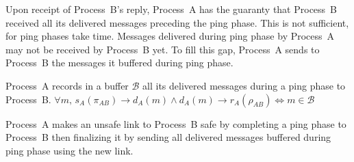 Upon receipt of Process~B's reply, Process~A has the guaranty that Process~B
received all its delivered messages preceding the ping phase. This is not
sufficient, for ping phases take time. Messages delivered during ping phase by
Process~A may not be received by Process~B yet. To fill this gap, Process~A
sends to Process~B the messages it buffered during ping phase.

\begin{definition}[Buffering]
  Process~A records in a buffer $\mathcal{B}$ all its delivered messages during
  a ping phase to Process~B.
  $\forall m,\, s_A(\pi_{AB}) \rightarrow d_A(m) \wedge d_A(m)\rightarrow
  r_A(\rho_{AB}) \Leftrightarrow m \in \mathcal{B} $
\end{definition}


\begin{lemma}
  Process~A makes an unsafe link to Process~B safe by completing a ping phase to
  Process~B then finalizing it by sending all delivered messages buffered during
  ping phase using the new link.
\end{lemma}

